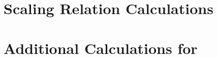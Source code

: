 \documentclass[twoside,10pt]{article}
\begin{document}
\lipsum[22-23]

\section{Scaling Relation Calculations}

\lipsum[24-26]

\section{Additional Calculations for \texorpdfstring{\ER}{Erdos Renyi}}

\lipsum[27-29]


\end{document}
